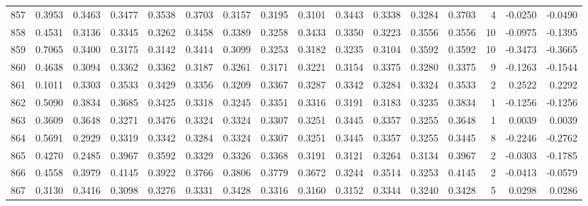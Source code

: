 \begin{tabular}{lrrrrrrrrrrrrrrr}
857 &      0.3953 &  0.3463 &  0.3477 &  0.3538 &  0.3703 &  0.3157 &  0.3195 &  0.3101 &  0.3443 &  0.3338 &   0.3284 &     0.3703 &      4 &                   -0.0250 &                    -0.0490 \\
858 &      0.4531 &  0.3136 &  0.3345 &  0.3262 &  0.3458 &  0.3389 &  0.3258 &  0.3433 &  0.3350 &  0.3223 &   0.3556 &     0.3556 &     10 &                   -0.0975 &                    -0.1395 \\
859 &      0.7065 &  0.3400 &  0.3175 &  0.3142 &  0.3414 &  0.3099 &  0.3253 &  0.3182 &  0.3235 &  0.3104 &   0.3592 &     0.3592 &     10 &                   -0.3473 &                    -0.3665 \\
860 &      0.4638 &  0.3094 &  0.3362 &  0.3362 &  0.3187 &  0.3261 &  0.3171 &  0.3221 &  0.3154 &  0.3375 &   0.3280 &     0.3375 &      9 &                   -0.1263 &                    -0.1544 \\
861 &      0.1011 &  0.3303 &  0.3533 &  0.3429 &  0.3356 &  0.3209 &  0.3367 &  0.3287 &  0.3342 &  0.3284 &   0.3324 &     0.3533 &      2 &                    0.2522 &                     0.2292 \\
862 &      0.5090 &  0.3834 &  0.3685 &  0.3425 &  0.3318 &  0.3245 &  0.3351 &  0.3316 &  0.3191 &  0.3183 &   0.3235 &     0.3834 &      1 &                   -0.1256 &                    -0.1256 \\
863 &      0.3609 &  0.3648 &  0.3271 &  0.3476 &  0.3324 &  0.3324 &  0.3307 &  0.3251 &  0.3445 &  0.3357 &   0.3255 &     0.3648 &      1 &                    0.0039 &                     0.0039 \\
864 &      0.5691 &  0.2929 &  0.3319 &  0.3342 &  0.3284 &  0.3324 &  0.3307 &  0.3251 &  0.3445 &  0.3357 &   0.3255 &     0.3445 &      8 &                   -0.2246 &                    -0.2762 \\
865 &      0.4270 &  0.2485 &  0.3967 &  0.3592 &  0.3329 &  0.3326 &  0.3368 &  0.3191 &  0.3121 &  0.3264 &   0.3134 &     0.3967 &      2 &                   -0.0303 &                    -0.1785 \\
866 &      0.4558 &  0.3979 &  0.4145 &  0.3922 &  0.3766 &  0.3806 &  0.3779 &  0.3672 &  0.3244 &  0.3514 &   0.3253 &     0.4145 &      2 &                   -0.0413 &                    -0.0579 \\
867 &      0.3130 &  0.3416 &  0.3098 &  0.3276 &  0.3331 &  0.3428 &  0.3316 &  0.3160 &  0.3152 &  0.3344 &   0.3240 &     0.3428 &      5 &                    0.0298 &                     0.0286 \\

\end{tabular}
